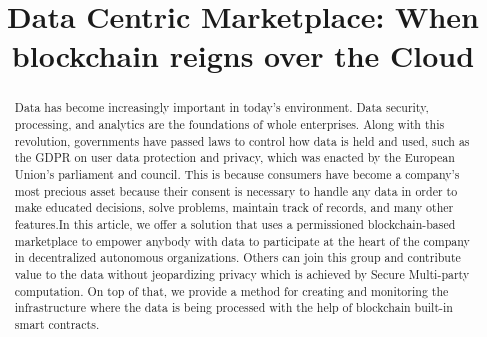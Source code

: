 \documentclass[conference]{IEEEtran}
\begin{document}
\title{Data Centric Marketplace: When blockchain reigns over the Cloud\\}

\author{
\and
{}
\and
{}
\and
{}
}

\maketitle

\begin{abstract}
Data has become increasingly important in today's environment. Data security, processing, and analytics are the foundations of whole enterprises. Along with this revolution, governments have passed laws to control how data is held and used, such as the GDPR on user data protection and privacy, which was enacted by the European Union's parliament and council. This is because consumers have become a company's most precious asset because their consent is necessary to handle any data in order to make educated decisions, solve problems, maintain track of records, and many other features.In this article, we offer a solution that uses a permissioned blockchain-based marketplace to empower anybody with data to participate at the heart of the company in decentralized autonomous organizations. Others can join this group and contribute value to the data without jeopardizing privacy which is achieved by Secure Multi-party computation. On top of that, we provide a method for creating and monitoring the infrastructure where the data is being processed with the help of blockchain built-in smart contracts.
\end{abstract}
\end{document}
